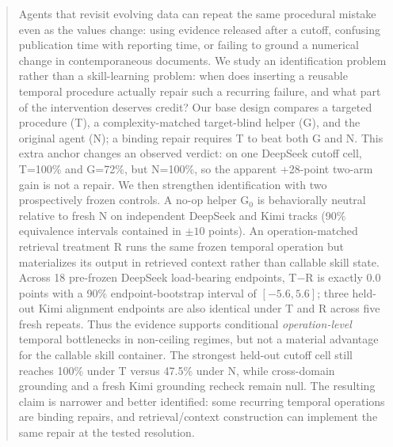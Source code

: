 \begin{abstract}
Agents that revisit evolving data can repeat the same procedural mistake even as the values change: using evidence released after a cutoff, confusing publication time with reporting time, or failing to ground a numerical change in contemporaneous documents. We study an identification problem rather than a skill-learning problem: when does inserting a reusable temporal procedure actually repair such a recurring failure, and what part of the intervention deserves credit? Our base design compares a targeted procedure (T), a complexity-matched target-blind helper (G), and the original agent (N); a binding repair requires T to beat both G and N. This extra anchor changes an observed verdict: on one DeepSeek cutoff cell, T=100\% and G=72\%, but N=100\%, so the apparent +28-point two-arm gain is not a repair. We then strengthen identification with two prospectively frozen controls. A no-op helper G$_0$ is behaviorally neutral relative to fresh N on independent DeepSeek and Kimi tracks (90\% equivalence intervals contained in $\pm10$ points). An operation-matched retrieval treatment R runs the same frozen temporal operation but materializes its output in retrieved context rather than callable skill state. Across 18 pre-frozen DeepSeek load-bearing endpoints, T$-$R is exactly 0.0 points with a 90\% endpoint-bootstrap interval of $[-5.6,5.6]$; three held-out Kimi alignment endpoints are also identical under T and R across five fresh repeats. Thus the evidence supports conditional \emph{operation-level} temporal bottlenecks in non-ceiling regimes, but not a material advantage for the callable skill container. The strongest held-out cutoff cell still reaches 100\% under T versus 47.5\% under N, while cross-domain grounding and a fresh Kimi grounding recheck remain null. The resulting claim is narrower and better identified: some recurring temporal operations are binding repairs, and retrieval/context construction can implement the same repair at the tested resolution.
\end{abstract}
